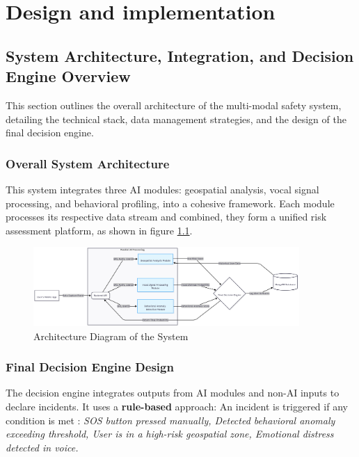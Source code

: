 \documentclass[12pt,a4paper,oneside,english]{book}
\begin{document}
{%



\chapter{Design and implementation}
\label{ch:4eme}
\section{System Architecture, Integration, and Decision Engine Overview}
\label{sec:system_architecture}
This section outlines the overall architecture of the multi-modal safety system, detailing the technical stack, data management strategies, and the design of the final decision engine.
\subsection{Overall System Architecture}
This system integrates three AI modules: geospatial analysis, vocal signal processing, and behavioral profiling, into a cohesive framework. 
Each module processes its respective data stream and combined, they form a unified risk assessment platform, as shown in figure \ref{fig:architecture}.
\begin{figure}[h!] %
    \centering
    \includegraphics[width=0.9\textwidth]{images/diag5.png}
    \caption{Architecture Diagram of the System}
    \label{fig:architecture}
\end{figure}


\subsection{Final Decision Engine Design}
The decision engine integrates outputs from AI modules and non-AI inputs to declare incidents. It uses a \textbf{rule-based} approach: 
An incident is triggered if any condition is met :
\textit{SOS button pressed manually, Detected behavioral anomaly exceeding threshold, User is in a high-risk geospatial zone, Emotional distress detected in voice.}

}
\end{document}
